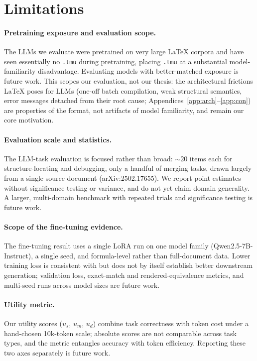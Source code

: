 \section*{Limitations}

\paragraph{Pretraining exposure and evaluation scope.} The LLMs we evaluate were pretrained on very large \LaTeX{} corpora and have seen essentially no \texttt{.tmu} during pretraining, placing \texttt{.tmu} at a substantial model-familiarity disadvantage. Evaluating models with better-matched exposure is future work. This scopes our evaluation, not our thesis: the architectural frictions {\LaTeX} poses for LLMs (one-off batch compilation, weak structural semantics, error messages detached from their root cause; Appendices~\ref{app:arch}--\ref{app:con}) are properties of the format, not artifacts of model familiarity, and remain our core motivation.

\paragraph{Evaluation scale and statistics.} The LLM-task evaluation is focused rather than broad: ${\sim}20$ items each for structure-locating and debugging, only a handful of merging tasks, drawn largely from a single source document (arXiv:2502.17655). We report point estimates without significance testing or variance, and do not yet claim domain generality. A larger, multi-domain benchmark with repeated trials and significance testing is future work.

\paragraph{Scope of the fine-tuning evidence.} The fine-tuning result uses a single LoRA run on one model family (Qwen2.5-7B-Instruct), a single seed, and formula-level rather than full-document data. Lower training loss is consistent with but does not by itself establish better downstream generation; validation loss, exact-match and rendered-equivalence metrics, and multi-seed runs across model sizes are future work.

\paragraph{Utility metric.} Our utility scores ($u_s$, $u_m$, $u_d$) combine task correctness with token cost under a hand-chosen 10k-token scale; absolute scores are not comparable across task types, and the metric entangles accuracy with token efficiency. Reporting these two axes separately is future work.

